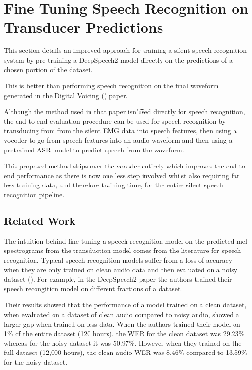 \section{Fine Tuning Speech Recognition on Transducer Predictions}

This section details an improved approach for training a silent speech
recognition system by pre-training a DeepSpeech2 model directly on the
predictions of a chosen portion of the dataset.

This is better than performing
speech recognition on the final waveform generated in the Digital Voicing
(\cite{gaddy2020digital}) paper.

Although the method used in that paper isn'\t
used directly for speech recognition, the end-to-end evaluation procedure
can be used for speech recognition by transducing from from the silent EMG
data into speech features, then using a vocoder to go from speech features
into an audio waveform and then using a pretrained ASR model to predict speech
from the waveform.

This proposed method skips over the vocoder entirely which improves the
end-to-end performance as there is now one less step involved whilst
also requiring far less training data, and therefore training time,
for the entire silent speech recognition pipeline.

\subsection{Related Work}

The intuition behind fine tuning a speech recognition model on the
predicted mel spectrograms from the transduction model comes
from the literature for speech recognition. Typical speech recognition models
suffer from a loss of accuracy when they are only trained on clean audio data
and then evaluated on a noisy dataset (\cite{DS2_original}). For example,
in the DeepSpeech2 paper the authors trained their speech recongition
model on different fractions of a dataset.

Their results showed that the
performance of a model trained on a clean dataset, when evaluated on a dataset
of clean audio compared to noisy audio, showed a larger gap when trained on less
data. When the authors trained their model on 1\% of the entire dataset (120 hours),
the WER for the clean dataset was 29.23\% whereas for the noisy dataset it was 50.97\%.
However when they trained on the full dataset (12,000 hours), the clean audio
WER was 8.46\% compared to 13.59\% for the noisy dataset.

